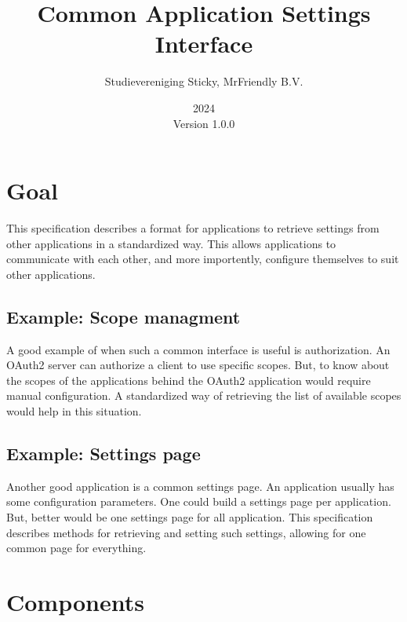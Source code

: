 \documentclass{article}
\begin{document}
    \begin{titlepage}
        \title{Common Application Settings Interface}
        \author{Studievereniging Sticky, MrFriendly B.V.}
        \date{2024\\Version 1.0.0}

        \maketitle
        \tableofcontents

        \pagebreak
    \end{titlepage}

    \section{Goal}
    \label{sec:goal}

    This specification describes a format for applications to retrieve
    settings from other applications in a standardized way.
    This allows applications to communicate with each other, and more importently,
    configure themselves to suit other applications.

    \subsection{Example: Scope managment}
    \label{subsec:example-scope-managment}

    A good example of when such a common interface is useful is
    authorization.
    An OAuth2 server can authorize a client to use specific scopes.
    But, to know about the scopes of the applications behind the OAuth2 application
    would require manual configuration.
    A standardized way of retrieving the list of available scopes would help in this situation.

    \subsection{Example: Settings page}
    \label{subsec:example-settings-page}

    Another good application is a common settings page.
    An application usually has some configuration parameters.
    One could build a settings page per application.
    But, better would be one settings page for all application.
    This specification describes methods for retrieving and setting such
    settings, allowing for one common page for everything.

    \section{Components}
    \label{sec:components}
\end{document}
